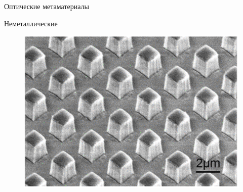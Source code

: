 \begin{frame}{Оптические метаматериалы}
    \begin{minipage}[b]{.5\textwidth}
    	Неметаллические
    	\begin{figure}
    		\includegraphics[width=\textwidth]{img/Ginn}
    		\caption{}
    	\end{figure}
    \end{minipage}
\end{frame}